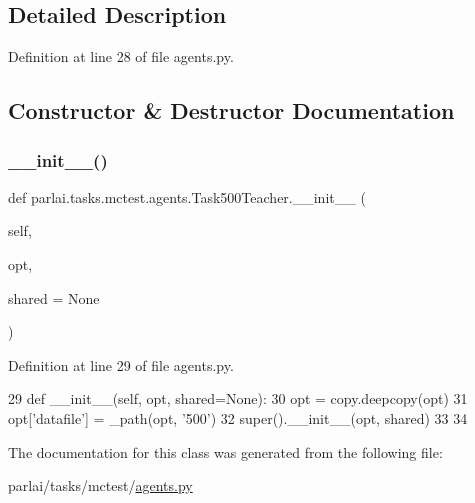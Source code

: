 \subsection{Detailed Description}


Definition at line 28 of file agents.\+py.



\subsection{Constructor \& Destructor Documentation}
\mbox{\label{classparlai_1_1tasks_1_1mctest_1_1agents_1_1Task500Teacher_a122ab6b53f9bb97f84ae1a5e29a6deca}} 
\subsubsection{\texorpdfstring{\+\_\+\+\_\+init\+\_\+\+\_\+()}{\_\_init\_\_()}}
{\footnotesize\ttfamily def parlai.\+tasks.\+mctest.\+agents.\+Task500\+Teacher.\+\_\+\+\_\+init\+\_\+\+\_\+ (\begin{DoxyParamCaption}\item[{}]{self,  }\item[{}]{opt,  }\item[{}]{shared = {\ttfamily None} }\end{DoxyParamCaption})}



Definition at line 29 of file agents.\+py.


\begin{DoxyCode}
29     \textcolor{keyword}{def }\_\_init\_\_(self, opt, shared=None):
30         opt = copy.deepcopy(opt)
31         opt[\textcolor{stringliteral}{'datafile'}] = \_path(opt, \textcolor{stringliteral}{'500'})
32         super().\_\_init\_\_(opt, shared)
33 
34 
\end{DoxyCode}


The documentation for this class was generated from the following file\+:\begin{DoxyCompactItemize}
\item 
parlai/tasks/mctest/\hyperlink{parlai_2tasks_2mctest_2agents_8py}{agents.\+py}\end{DoxyCompactItemize}
